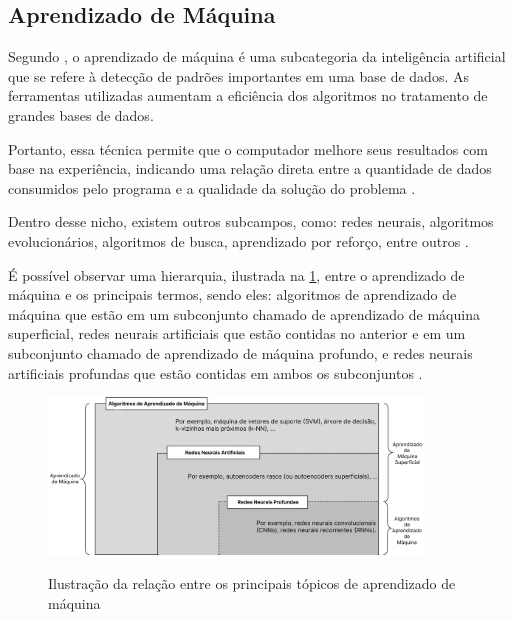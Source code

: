 \subsection{Aprendizado de Máquina}

Segundo , o aprendizado de máquina é uma subcategoria da inteligência artificial que se refere à detecção de padrões importantes em uma base de dados. As ferramentas utilizadas aumentam a eficiência dos algoritmos no tratamento de grandes bases de dados.

Portanto, essa técnica permite que o computador melhore seus resultados com base na experiência, indicando uma relação direta entre a quantidade de dados consumidos pelo programa e a qualidade da solução do problema \cite{ml_explicado}.

Dentro desse nicho, existem outros subcampos, como: redes neurais, algoritmos evolucionários, algoritmos de busca, aprendizado por reforço, entre outros \cite{ml_oil_gas_industry}.

É possível observar uma hierarquia, ilustrada na \cref{fig:diagrama_ann}, entre o aprendizado de máquina e os principais termos, sendo eles: algoritmos de aprendizado de máquina que estão em um subconjunto chamado de aprendizado de máquina superficial, redes neurais artificiais que estão contidas no anterior e em um subconjunto chamado de aprendizado de máquina profundo, e redes neurais artificiais profundas que estão contidas em ambos os subconjuntos \cite{ml_and_dp}.

\begin{figure}[ht]
	\caption{Ilustração da relação entre os principais tópicos de aprendizado de máquina}
	\centering %
	\includegraphics[width=10cm]{figures/diagrama_ann.png} %
	\label{fig:diagrama_ann}
\end{figure}
